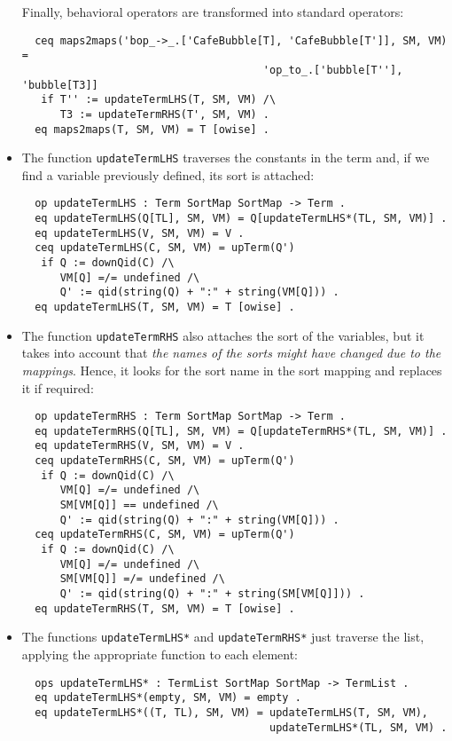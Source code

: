 \begin{itemize}
Finally, behavioral operators are transformed into standard operators:

{\codesize
\begin{verbatim}
  ceq maps2maps('bop_->_.['CafeBubble[T], 'CafeBubble[T']], SM, VM) =
                                      'op_to_.['bubble[T''], 'bubble[T3]]
   if T'' := updateTermLHS(T, SM, VM) /\
      T3 := updateTermRHS(T', SM, VM) .
  eq maps2maps(T, SM, VM) = T [owise] .
\end{verbatim}
}

\item
The function \verb"updateTermLHS" traverses the constants in the term and,
if we find a variable previously defined, its sort is attached:

{\codesize
\begin{verbatim}
  op updateTermLHS : Term SortMap SortMap -> Term .
  eq updateTermLHS(Q[TL], SM, VM) = Q[updateTermLHS*(TL, SM, VM)] .
  eq updateTermLHS(V, SM, VM) = V .
  ceq updateTermLHS(C, SM, VM) = upTerm(Q')
   if Q := downQid(C) /\
      VM[Q] =/= undefined /\
      Q' := qid(string(Q) + ":" + string(VM[Q])) .
  eq updateTermLHS(T, SM, VM) = T [owise] .
\end{verbatim}
}

\item
The function \verb"updateTermRHS" also attaches the sort of the variables,
but it takes into account that \emph{the names of the sorts might have changed
due to the mappings}. Hence, it looks for the sort name in the sort mapping and
replaces it if required:

{\codesize
\begin{verbatim}
  op updateTermRHS : Term SortMap SortMap -> Term .
  eq updateTermRHS(Q[TL], SM, VM) = Q[updateTermRHS*(TL, SM, VM)] .
  eq updateTermRHS(V, SM, VM) = V .
  ceq updateTermRHS(C, SM, VM) = upTerm(Q')
   if Q := downQid(C) /\
      VM[Q] =/= undefined /\
      SM[VM[Q]] == undefined /\
      Q' := qid(string(Q) + ":" + string(VM[Q])) .
  ceq updateTermRHS(C, SM, VM) = upTerm(Q')
   if Q := downQid(C) /\
      VM[Q] =/= undefined /\
      SM[VM[Q]] =/= undefined /\
      Q' := qid(string(Q) + ":" + string(SM[VM[Q]])) .
  eq updateTermRHS(T, SM, VM) = T [owise] .
\end{verbatim}
}

\item
The functions \verb"updateTermLHS*" and \verb"updateTermRHS*" just traverse
the list, applying the appropriate function to each element:

{\codesize
\begin{verbatim}
  ops updateTermLHS* : TermList SortMap SortMap -> TermList .
  eq updateTermLHS*(empty, SM, VM) = empty .
  eq updateTermLHS*((T, TL), SM, VM) = updateTermLHS(T, SM, VM),
                                       updateTermLHS*(TL, SM, VM) .


\end{verbatim}}
\end{itemize}
